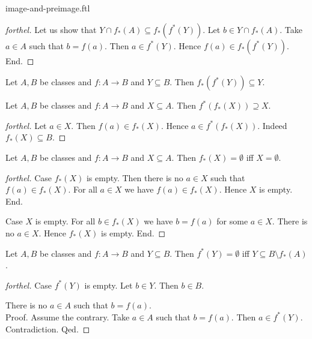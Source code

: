 \documentclass{naproche-library}
\begin{document}
\begin{smodule}{image-and-preimage.ftl}
\begin{proof}[forthel]
    Let us show that $Y \cap f_{*}(A) \subseteq f_{*}(f^{*}(Y))$.
      Let $b \in Y \cap f_{*}(A)$.
      Take $a \in A$ such that $b = f(a)$.
      Then $a \in f^{*}(Y)$.
      Hence $f(a) \in f_{*}(f^{*}(Y))$.
    End.
  \end{proof}

  \begin{corollary}[forthel,id=FOUNDATIONS_07_5585105345052672]
    Let $A, B$ be classes and $f : A \to B$ and $Y \subseteq B$.
    Then $f_{*}(f^{*}(Y)) \subseteq Y$.
  \end{corollary}

  \begin{proposition}[forthel,id=FOUNDATIONS_07_4890896170483712]
    Let $A, B$ be classes and $f : A \to B$ and $X \subseteq A$.
    Then $f^{*}(f_{*}(X)) \supseteq X$.
  \end{proposition}
  \begin{proof}[forthel]
    Let $a \in X$.
    Then $f(a) \in f_{*}(X)$.
    Hence $a \in f^{*}(f_{*}(X))$.
    Indeed $f_{*}(X) \subseteq B$.
  \end{proof}

  \begin{proposition}[forthel,id=FOUNDATIONS_07_3318372355801088]
    Let $A, B$ be classes and $f : A \to B$ and $X \subseteq A$.
    Then $f_{*}(X) = \emptyset$ iff $X = \emptyset$.
  \end{proposition}
  \begin{proof}[forthel]
    Case $f_{*}(X)$ is empty.
      Then there is no $a \in X$ such that $f(a) \in f_{*}(X)$.
      For all $a \in X$ we have $f(a) \in f_{*}(X)$.
      Hence $X$ is empty.
    End.

    Case $X$ is empty.
      For all $b \in f_{*}(X)$ we have $b = f(a)$ for some $a \in X$.
      There is no $a \in X$.
      Hence $f_{*}(X)$ is empty.
    End.
  \end{proof}

  \begin{proposition}[forthel,id=FOUNDATIONS_07_8597874786959360]
    Let $A, B$ be classes and $f : A \to B$ and $Y \subseteq B$.
    Then $f^{*}(Y) = \emptyset$ iff $Y \subseteq B \setminus f_{*}(A)$.
  \end{proposition}
  \begin{proof}[forthel]
    Case $f^{*}(Y)$ is empty.
      Let $b \in Y$.
      Then $b \in B$.

      There is no $a \in A$ such that $b = f(a)$. \\
      Proof.
        Assume the contrary.
        Take $a \in A$ such that $b = f(a)$.
        Then $a \in f^{*}(Y)$.
        Contradiction.
      Qed.


\end{proof}
\end{smodule}
\end{document}

